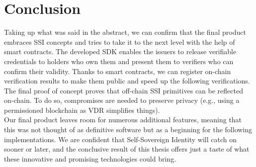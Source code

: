 \chapter*{Conclusion}
Taking up what was said in the abstract, we can confirm that the final product embraces 
SSI concepts and tries to take it to the next level with the help of smart contracts.  
The developed SDK enables the issuers to release verifiable credentials to holders who 
own them and present them to verifiers who can confirm their validity. Thanks to smart 
contracts, we can register on-chain verification results to make them public and speed 
up the following verifications. The final proof of concept proves that off-chain SSI 
primitives can be reflected on-chain. To do so, compromises are needed to preserve 
privacy (e.g., using a permissioned blockchain as VDR simplifies things).
\vspace{0.3cm}\\
Our final product leaves room for numerous additional features, meaning that this was 
not thought of as definitive software but as a beginning for the following implementations.
We are confident that Self-Sovereign Identity will catch on sooner or later, and the 
conclusive result of this thesis offers just a taste of what these innovative and
promising technologies could bring.
